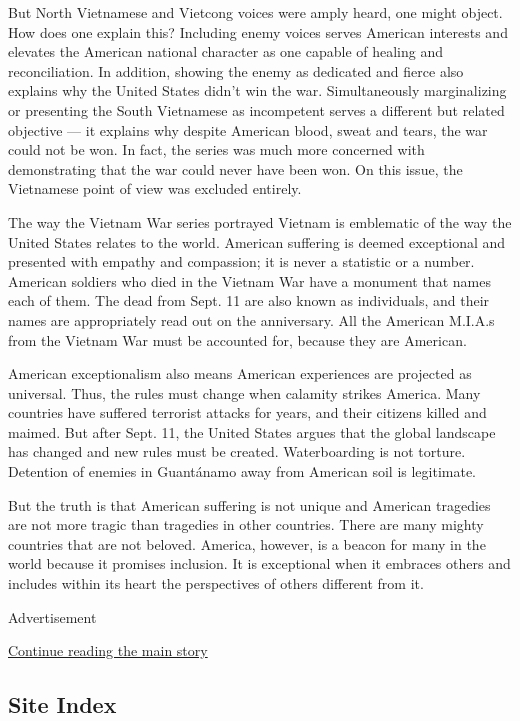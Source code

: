 But North Vietnamese and Vietcong voices were amply heard, one might
object. How does one explain this? Including enemy voices serves
American interests and elevates the American national character as one
capable of healing and reconciliation. In addition, showing the enemy as
dedicated and fierce also explains why the United States didn't win the
war. Simultaneously marginalizing or presenting the South Vietnamese as
incompetent serves a different but related objective --- it explains why
despite American blood, sweat and tears, the war could not be won. In
fact, the series was much more concerned with demonstrating that the war
could never have been won. On this issue, the Vietnamese point of view
was excluded entirely.

The way the Vietnam War series portrayed Vietnam is emblematic of the
way the United States relates to the world. American suffering is deemed
exceptional and presented with empathy and compassion; it is never a
statistic or a number. American soldiers who died in the Vietnam War
have a monument that names each of them. The dead from Sept. 11 are also
known as individuals, and their names are appropriately read out on the
anniversary. All the American M.I.A.s from the Vietnam War must be
accounted for, because they are American.

American exceptionalism also means American experiences are projected as
universal. Thus, the rules must change when calamity strikes America.
Many countries have suffered terrorist attacks for years, and their
citizens killed and maimed. But after Sept. 11, the United States argues
that the global landscape has changed and new rules must be created.
Waterboarding is not torture. Detention of enemies in Guantánamo away
from American soil is legitimate.

But the truth is that American suffering is not unique and American
tragedies are not more tragic than tragedies in other countries. There
are many mighty countries that are not beloved. America, however, is a
beacon for many in the world because it promises inclusion. It is
exceptional when it embraces others and includes within its heart the
perspectives of others different from it.

Advertisement

\protect\hyperlink{after-bottom}{Continue reading the main story}

\hypertarget{site-index}{%
\subsection{Site Index}\label{site-index}}

